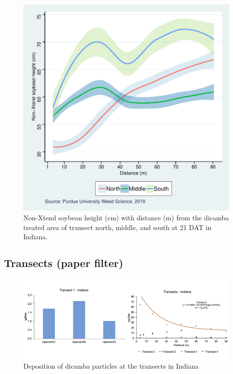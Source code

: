 \documentclass[]{article}
\begin{document}
\begin{figure}
\centering
\includegraphics{Report_files/figure-latex/unnamed-chunk-42-1.pdf}
\caption{Non-Xtend soybean height (cm) with distance (m) from the
dicamba treated area of transect north, middle, and south at 21 DAT in
Indiana.}
\end{figure}

\pagebreak
\newpage

\subsection{Transects (paper filter)}\label{transects-paper-filter-1}

\begin{figure}[h]

{\centering \includegraphics[width=1\linewidth]{INtransect} 

}

\caption{Deposition of dicamba particles at the transects in Indiana}\label{fig:unnamed-chunk-43}
\end{figure}
\end{document}
